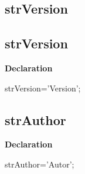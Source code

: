 \documentclass{report}
\newif\ifpdf
\begin{document}
\subsection*{\large{\textbf{strVersion}}\normalsize\hspace{1ex}\hrulefill}
\else
\subsection*{strVersion}
\fi
\label{trstrings-strVersion}
\begin{list}{}{
\setlength{\itemindent}{0cm}
\setlength{\listparindent}{0cm}
\setlength{\leftmargin}{\evensidemargin}
\addtolength{\leftmargin}{\tmplength}
\settowidth{\labelsep}{X}
\addtolength{\leftmargin}{\labelsep}
\setlength{\labelwidth}{\tmplength}
}
\item[\textbf{Declaration}\hfill]
\ifpdf
\begin{flushleft}
\fi
\begin{ttfamily}
strVersion='Version';\end{ttfamily}

\ifpdf
\end{flushleft}
\fi

\end{list}
\ifpdf
\subsection*{\large{\textbf{strAuthor}}\normalsize\hspace{1ex}\hrulefill}
\else
\subsection*{strAuthor}
\fi
\label{trstrings-strAuthor}
\begin{list}{}{
\setlength{\itemindent}{0cm}
\setlength{\listparindent}{0cm}
\setlength{\leftmargin}{\evensidemargin}
\addtolength{\leftmargin}{\tmplength}
\settowidth{\labelsep}{X}
\addtolength{\leftmargin}{\labelsep}
\setlength{\labelwidth}{\tmplength}
}
\item[\textbf{Declaration}\hfill]
\ifpdf
\begin{flushleft}
\fi
\begin{ttfamily}
strAuthor='Autor';\end{ttfamily}

\ifpdf
\end{flushleft}
\fi

\end{list}
\ifpdf
\end{document}
